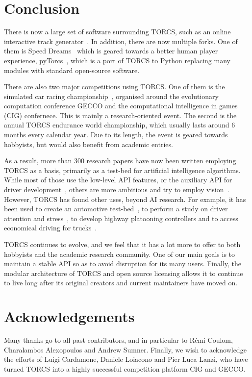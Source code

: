 \documentclass[a4paper]{article}
\begin{document}
\section{Conclusion}

There is now a large set of software surrounding TORCS, such as an online interactive track generator~\cite{cardamone2011interactive}. In addition, there are now multiple forks. One of them is Speed Dreams~\cite{speed-dreams} which is geared towards a better human player experience, pyTorcs~\cite{pytorcs}, which is a port of TORCS to Python replacing many modules  with standard open-source software.

There are also two major competitions using TORCS. One of them is the simulated car racing championship~\cite{car-racing}, organised around the evolutionary computation conference GECCO and the computational intelligence in games (CIG) confernece. This is mainly a research-oriented event. The second is the annual TORCS endurance world championship\cite{torcs-endurance}, which usually lasts around 6 months every calendar year. Due to its length, the event is geared towards hobbyists, but would also benefit from academic entries.

As a result, more than 300 research papers have now been written employing TORCS as a basis, primarily as a test-bed for artificial intelligence algorithms. While most of those use the low-level API features, or the auxiliary API for driver development~\cite{caldeiratorcs}, others are more ambitious and try to employ vision~\cite{koutnikevolving,tran2010towards}. 
However, TORCS has found other uses, beyond AI research. For example, it has been used to create an automotive test-bed~\cite{drolia2011autoplug}, to perform a study on driver attention and stress~\cite{benoit2009multimodal}, to develop highway platooning controllers and to access economical driving for trucks~\cite{bogoni2012use}.

TORCS continues to evolve, and we feel that it has a lot more to offer to both hobbyists and the academic research community. One of our main goals is to maintain a stable API so as to avoid disruption for its many users. Finally, the modular architecture of TORCS and open source licensing allows it to continue to live long after its original creators and current maintainers have moved on. 

\section*{Acknowledgements}
Many thanks go to all past contributors, and in particular to R\'emi Coulom, Charalambos Alexopoulos and Andrew Sumner. Finally, we wish to acknowledge the efforts of Luigi Cardamone, Daniele Loiacono and Pier Luca Lanzi, who have turned TORCS into a highly successful competition platform CIG and GECCO.



\end{document}
